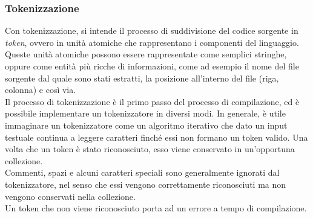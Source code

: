 \subsubsection{Tokenizzazione}
Con tokenizzazione, si intende il processo di suddivisione del codice sorgente in \textit{token}, ovvero in unità 
atomiche che rappresentano i componenti del linguaggio. Queste unità atomiche possono essere rappresentate come 
semplici stringhe, oppure come entità più ricche di informazioni, come ad esempio il nome del file sorgente dal quale
sono stati estratti, la posizione all'interno del file (riga, colonna) e così via.\\

Il processo di tokenizzazione è il primo passo del processo di compilazione, ed è possibile implementare un tokenizzatore
in diversi modi. In generale, è utile immaginare un tokenizzatore come un algoritmo iterativo che dato un input testuale
continua a leggere caratteri finché essi non formano un token valido. Una volta che un token è stato riconosciuto, 
esso viene conservato in un'opportuna collezione. \\

Commenti, spazi e alcuni caratteri speciali sono generalmente ignorati dal tokenizzatore, nel senso che essi 
vengono correttamente riconosciuti ma non vengono conservati nella collezione. \\

Un token che non viene riconosciuto porta ad un errore a tempo di compilazione. 